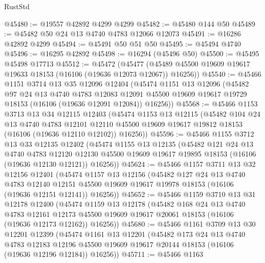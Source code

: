 \begin{lexlean}{RustStd}
\begin{coremodule}
@45480 := @19557 @42892 @4299 @4299
@45482 := @45480 @144 @50
@45489 := @45482 @50 @24 @13 @4740 @4783 @12066 @12073
@45491 := @16286 @42892 @4299
@45494 := @45491 @50 @51 @50
@45495 := @45494 @4740
@45496 := @16295 @42892
@45498 := @16294 (@45496 @50)
@45500 := @45495 @45498 @17713
@45512 := @45472
    (@45477 (@45489 @45500 @19609 @19617 @19633 @18153 (@16106 (@19636 @12073 @12067)) @16256))
@45540 := @45466
    @1151
    @3714
    @13
    @35
    @12096
    @12404
    (@45474
      @1151
      @13
      @12096
      (@45482
        @97
        @24
        @13
        @4740
        @4783
        @12083
        @12091
        @45500
        @19609
        @19617
        @19729
        @18153
        (@16106 (@19636 @12091 @12084))
        @16256))
@45568 := @45466
    @1153
    @3713
    @13
    @34
    @12115
    @12403
    (@45474
      @1153
      @13
      @12115
      (@45482
        @104
        @24
        @13
        @4740
        @4783
        @12101
        @12110
        @45500
        @19609
        @19617
        @19812
        @18153
        (@16106 (@19636 @12110 @12102))
        @16256))
@45596 := @45466
    @1155
    @3712
    @13
    @33
    @12135
    @12402
    (@45474
      @1155
      @13
      @12135
      (@45482
        @121
        @24
        @13
        @4740
        @4783
        @12120
        @12130
        @45500
        @19609
        @19617
        @19895
        @18153
        (@16106 (@19636 @12130 @12121))
        @16256))
@45624 := @45466
    @1157
    @3711
    @13
    @32
    @12156
    @12401
    (@45474
      @1157
      @13
      @12156
      (@45482
        @127
        @24
        @13
        @4740
        @4783
        @12140
        @12151
        @45500
        @19609
        @19617
        @19978
        @18153
        (@16106 (@19636 @12151 @12141))
        @16256))
@45652 := @45466
    @1159
    @3710
    @13
    @31
    @12178
    @12400
    (@45474
      @1159
      @13
      @12178
      (@45482
        @168
        @24
        @13
        @4740
        @4783
        @12161
        @12173
        @45500
        @19609
        @19617
        @20061
        @18153
        (@16106 (@19636 @12173 @12162))
        @16256))
@45680 := @45466
    @1161
    @3709
    @13
    @30
    @12201
    @12399
    (@45474
      @1161
      @13
      @12201
      (@45482
        @173
        @24
        @13
        @4740
        @4783
        @12183
        @12196
        @45500
        @19609
        @19617
        @20144
        @18153
        (@16106 (@19636 @12196 @12184))
        @16256))
@45711 := @45466
    @1163

\end{coremodule}
\end{lexlean}
